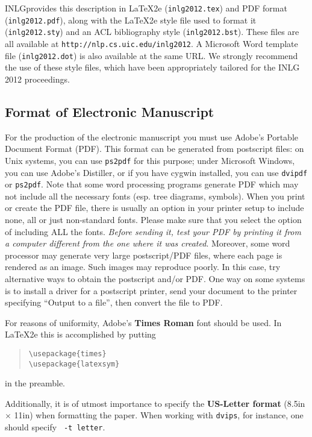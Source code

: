 \documentclass[11pt,letterpaper]{article}
\begin{document}
INLGprovides this description in \LaTeX2e{} ({\tt inlg2012.tex}) and PDF
format ({\tt inlg2012.pdf}), along with the \LaTeX2e{} style file used to
format it ({\tt inlg2012.sty}) and an ACL bibliography style ({\tt inlg2012.bst}).
These files are all available at
{\tt http://nlp.cs.uic.edu/inlg2012}.  A Microsoft Word
template file ({\tt inlg2012.dot}) is also available at the same URL. We
strongly recommend the use of these style files, which have been
appropriately tailored for the INLG 2012 proceedings.


\subsection{Format of Electronic Manuscript}
\label{sect:pdf}

For the production of the electronic manuscript you must use Adobe's
Portable Document Format (PDF). This format can be generated from
postscript files: on Unix systems, you can use {\tt ps2pdf} for this
purpose; under Microsoft Windows, you can use Adobe's Distiller, or
if you have cygwin installed, you can use {\tt dvipdf} or
{\tt ps2pdf}.  Note 
that some word processing programs generate PDF which may not include
all the necessary fonts (esp. tree diagrams, symbols). When you print
or create the PDF file, there is usually an option in your printer
setup to include none, all or just non-standard fonts.  Please make
sure that you select the option of including ALL the fonts.  {\em
  Before sending it, test your {\/\em PDF} by printing it from a
  computer different from the one where it was created}. Moreover,
some word processor may generate very large postscript/PDF files,
where each page is rendered as an image. Such images may reproduce
poorly.  In this case, try alternative ways to obtain the postscript
and/or PDF.  One way on some systems is to install a driver for a
postscript printer, send your document to the printer specifying
``Output to a file'', then convert the file to PDF.

For reasons of uniformity, Adobe's {\bf Times Roman} font should be
used. In \LaTeX2e{} this is accomplished by putting

\begin{quote}
\begin{verbatim}
\usepackage{times}
\usepackage{latexsym}
\end{verbatim}
\end{quote}
in the preamble.

Additionally, it is of utmost importance to specify the {\bf
  US-Letter format} (8.5in $\times$ 11in) when formatting the paper.
When working with {\tt dvips}, for instance, one should specify {\tt
  -t letter}.
\end{document}
